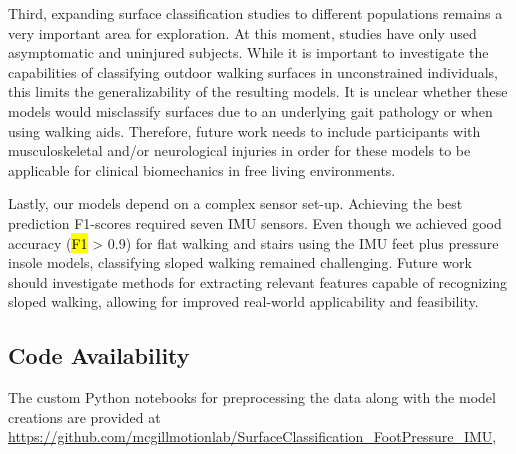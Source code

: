 \documentclass[sensors,article,accept,pdftex,moreauthors]{Definitions/mdpi}
\begin{document}
Third, expanding surface classification studies to different populations remains a very important area for exploration. At this moment, studies have only used asymptomatic and uninjured subjects. While it is important to investigate the capabilities of classifying outdoor walking surfaces in unconstrained individuals, this limits the generalizability of the resulting models. It is unclear whether these models would misclassify surfaces due to an underlying gait pathology or when using walking aids. Therefore, future work needs to include participants with musculoskeletal and/or neurological injuries in order for these models to be applicable for clinical biomechanics in free living environments.  

Lastly, our models depend on a complex sensor set-up. Achieving the best prediction F1-scores required seven IMU sensors. \textcolor{revision}{Even though we achieved good accuracy (\hl{F1} %
 > 0.9) for flat walking and stairs using the IMU feet plus pressure insole models, classifying sloped walking remained challenging.} Future work should investigate methods for \textcolor{revision}{extracting relevant features capable of recognizing sloped walking}, allowing for improved real-world applicability and feasibility.



% 
\subsection{Code Availability}
The custom Python notebooks for preprocessing the data along with the model creations are provided at \url{https://github.com/mcgillmotionlab/SurfaceClassification_FootPressure_IMU}, %


\vspace{6pt}
\end{document}
